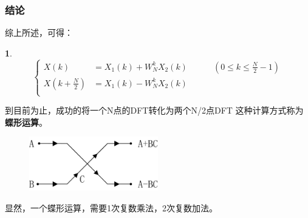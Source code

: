 \documentclass[notheorems,compress,mathserif,table]{beamer}
\newtheorem{dablock}{}
\begin{document}
\begin{frame}[shrink]\frametitle{结论}
综上所述，可得：
\begin{dablock}
\begin{equation*}
\left\{ \begin{aligned}
          X(k)\quad      &=X_{1}(k) + W_{N}^{k}X_{2}(k)  \quad\quad\quad(0\leq k\leq\frac{N}{2}-1)\\
         X(k+\frac{N}{2})&=X_{1}(k) - W_{N}^{k}X_{2}(k)  \\
\end{aligned} \right.
\end{equation*}
\end{dablock}

到目前为止，成功的将一个N点的DFT转化为两个N/2点DFT%
\newline
\pause
这种计算方式称为\textbf{蝶形运算}。
\begin{figure}[h]
  \centering
  \includegraphics[width=0.50\textwidth]{diexingyunsuan.jpg}
\end{figure}
显然，一个蝶形运算，需要1次复数乘法，2次复数加法。
\end{frame}
\end{document}
